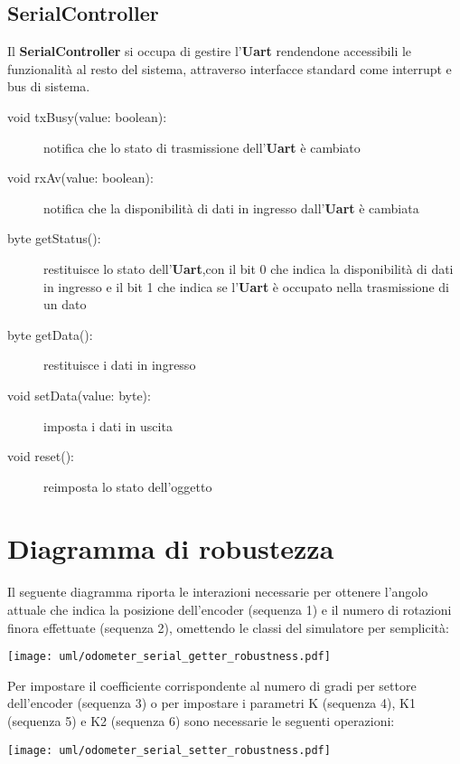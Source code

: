 \documentclass [11pt,a4paper,oneside]{paper}
\newcommand{\component}[1]{\textbf{#1}}
\begin{document}
\subsection{SerialController}
Il \component{SerialController} si occupa di gestire l'\component{Uart}
rendendone accessibili le funzionalità al resto del sistema,
attraverso interfacce standard come interrupt e bus di sistema.

\begin{description}
\item[void txBusy(value: boolean):] notifica che lo stato di trasmissione
    dell'\component{Uart} è cambiato
\item[void rxAv(value: boolean):] notifica che la disponibilità di dati
    in ingresso dall'\component{Uart} è cambiata
\item[byte getStatus():] restituisce lo stato dell'\component{Uart},con il
    bit 0 che indica la disponibilità di dati in ingresso e il bit 1 che
    indica se l'\component{Uart} è occupato nella trasmissione di un dato
\item[byte getData():] restituisce i dati in ingresso
\item[void setData(value: byte):] imposta i dati in uscita
\item[void reset():] reimposta lo stato dell'oggetto
\end{description}

\section{Diagramma di robustezza}
Il seguente diagramma riporta le interazioni necessarie per ottenere
l'angolo attuale che indica la posizione dell'encoder (sequenza 1) e
il numero di rotazioni finora effettuate (sequenza 2), omettendo
le classi del simulatore per semplicità:
\begin{center}
    \texttt{[image: uml/odometer\_serial\_getter\_robustness.pdf]}
    \label{serial_getter_robustness}
\end{center}

Per impostare il coefficiente corrispondente al numero di gradi per settore
dell'encoder (sequenza 3) o per impostare i parametri K (sequenza 4), K1
(sequenza 5) e K2 (sequenza 6) sono necessarie le seguenti operazioni:
\begin{center}
    \texttt{[image: uml/odometer\_serial\_setter\_robustness.pdf]}
    \label{serial_getter_robustness}
\end{center}
\end{document}
